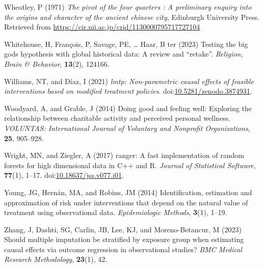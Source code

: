 \documentclass[
  single column]{article}
\newlength{\cslhangindent}
\newenvironment{CSLReferences}[2] %
 {\begin{list}{}{%
  \setlength{\itemindent}{0pt}
  \setlength{\leftmargin}{0pt}
  \setlength{\parsep}{0pt}
  \ifodd #1
   \setlength{\leftmargin}{\cslhangindent}
   \setlength{\itemindent}{-1\cslhangindent}
  \fi
  \setlength{\itemsep}{#2\baselineskip}}}
 {\end{list}}
\begin{document}
\begin{CSLReferences}{1}{0}
Wheatley, P (1971) \emph{The pivot of the four quarters : A preliminary
enquiry into the origins and character of the ancient chinese city},
Edinburgh University Press. Retrieved from
\url{https://cir.nii.ac.jp/crid/1130000795717727104}

Whitehouse, H, François, P, Savage, PE, \ldots{} Haar, B ter (2023)
Testing the big gods hypothesis with global historical data: A review
and {``}retake{''}. \emph{Religion, Brain \& Behavior}, \textbf{13}(2),
124166.

Williams, NT, and Díaz, I (2021) \emph{{l}mtp: Non-parametric causal
effects of feasible interventions based on modified treatment policies}.
doi:\href{https://doi.org/10.5281/zenodo.3874931}{10.5281/zenodo.3874931}.

Woodyard, A, and Grable, J (2014) Doing good and feeling well: Exploring
the relationship between charitable activity and perceived personal
wellness. \emph{VOLUNTAS: International Journal of Voluntary and
Nonprofit Organizations}, \textbf{25}, 905--928.

Wright, MN, and Ziegler, A (2017) {ranger}: A fast implementation of
random forests for high dimensional data in {C++} and {R}. \emph{Journal
of Statistical Software}, \textbf{77}(1), 1--17.
doi:\href{https://doi.org/10.18637/jss.v077.i01}{10.18637/jss.v077.i01}.

Young, JG, Hernán, MA, and Robins, JM (2014) Identification, estimation
and approximation of risk under interventions that depend on the natural
value of treatment using observational data. \emph{Epidemiologic
Methods}, \textbf{3}(1), 1--19.

Zhang, J, Dashti, SG, Carlin, JB, Lee, KJ, and Moreno-Betancur, M (2023)
Should multiple imputation be stratified by exposure group when
estimating causal effects via outcome regression in observational
studies? \emph{BMC Medical Research Methodology}, \textbf{23}(1), 42.

\end{CSLReferences}
\end{document}
